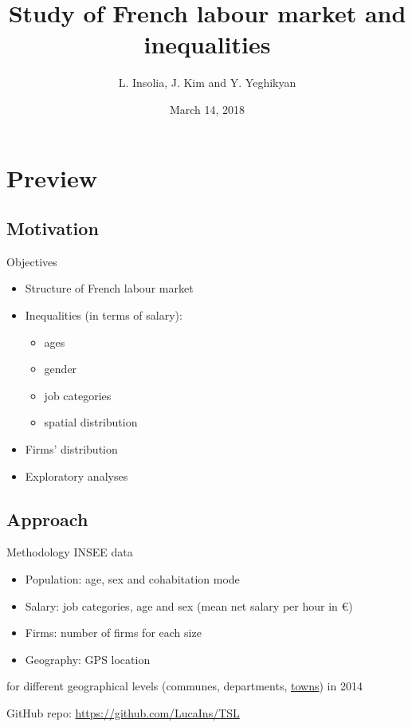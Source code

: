 \documentclass[12pt]{beamer}
\title[Study of French labour market and inequalities]{Study of French labour market and inequalities}
\author{L. Insolia, J. Kim and Y. Yeghikyan}
\institute{SNS \\
		   \vskip0.5cm\centering\small \textcolor{rscuro}{--- \emph{Midterm results} ---}}
\date{March 14, 2018}
\begin{document}
	
\begin{frame}
	
	\maketitle
\end{frame}


\section{Preview}

\subsection{Motivation}

\begin{frame}{\textcolor{bscuro}{Objectives}}
	\begin{itemize}
		\item Structure of French labour market 
		\item Inequalities (in terms of salary): 
		\begin{itemize}
			\item ages 
			\item gender
			\item job categories
			\item spatial distribution
		\end{itemize}
		\item Firms' distribution
		\item Exploratory analyses
	\end{itemize}
\end{frame}
		

\subsection{Approach}

\begin{frame}{\textcolor{bscuro}{Methodology}}
	INSEE data
	\begin{itemize}
		\item Population: age, sex and cohabitation mode
		\item Salary: job categories, age and sex (mean net salary per hour in \euro)
		\item Firms: number of firms for each size
		\item Geography: GPS location
	\end{itemize}
	for different geographical levels (communes, departments, \underline{towns}) in 2014
	
	
	\vskip1cm GitHub repo: \textcolor{bscuro}{\url{https://github.com/LucaIns/TSL}} %
\end{frame}
				
\end{document}
